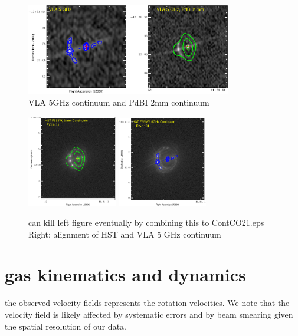 \documentclass[]{emulateapj}
\begin{document}
\begin{figure}[!htbp]
\centering
\includegraphics[width=0.8\textwidth]{../Figures/Cont2mm_5GHz_double.eps}
\caption{VLA 5GHz continuum and PdBI 2mm continuum
 \label{fig:cont}}
\end{figure}


\begin{figure}[!htbp]
\centering
\includegraphics[width=0.35\textwidth]{../Figures/F555W_ContPdBI.eps}
\includegraphics[width=0.35\textwidth]{../Figures/F555W_ContVLA.eps}
\caption{
can kill left figure eventually by combining this to ContCO21.eps
Right: alignment of HST and VLA 5 GHz continuum
 \label{fig:}}
\end{figure}


\section{gas kinematics and dynamics}
the observed velocity fields represents the rotation velocities.  
We note that the velocity field is likely affected by
systematic errors and by beam smearing given the spatial resolution of our data.
\end{document}
